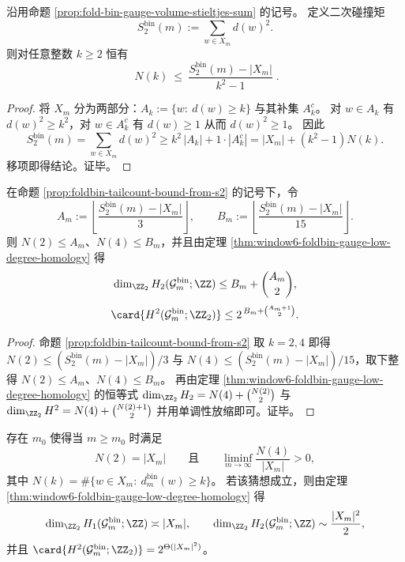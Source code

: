 \begin{proposition}[二次碰撞矩对阈值尾计数的普适上界]\label{prop:foldbin-tailcount-bound-from-s2}
沿用命题 \ref{prop:fold-bin-gauge-volume-stieltjes-sum} 的记号。
定义二次碰撞矩
\[
S_2^{\mathrm{bin}}(m):=\sum_{w\in X_m}d(w)^2.
\]
则对任意整数 \(k\ge 2\) 恒有
\[
\boxed{\;
N(k)\ \le\ \frac{S_2^{\mathrm{bin}}(m)-|X_m|}{k^2-1}\; }.
\]
\end{proposition}
\begin{proof}
将 \(X_m\) 分为两部分：\(A_k:=\{w:\ d(w)\ge k\}\) 与其补集 \(A_k^{c}\)。
对 \(w\in A_k\) 有 \(d(w)^2\ge k^2\)，对 \(w\in A_k^{c}\) 有 \(d(w)\ge 1\) 从而 \(d(w)^2\ge 1\)。
因此
\[
S_2^{\mathrm{bin}}(m)=\sum_{w\in X_m}d(w)^2
\ge
k^2\,|A_k|+1\cdot|A_k^{c}|
=|X_m|+(k^2-1)N(k).
\]
移项即得结论。证毕。
\end{proof}

\begin{corollary}\label{cor:foldbin-central-2extension-moment-certificate}
在命题 \ref{prop:foldbin-tailcount-bound-from-s2} 的记号下，令
\[
A_m:=\left\lfloor\frac{S_2^{\mathrm{bin}}(m)-|X_m|}{3}\right\rfloor,
\qquad
B_m:=\left\lfloor\frac{S_2^{\mathrm{bin}}(m)-|X_m|}{15}\right\rfloor.
\]
则 \(N(2)\le A_m\)、\(N(4)\le B_m\)，并且由定理 \ref{thm:window6-foldbin-gauge-low-degree-homology} 得
\[
\dim_{\ZZ_2}H_2(\mathcal{G}^{\mathrm{bin}}_m;\ZZ)
\le
B_m+\binom{A_m}{2},
\]
\[
\card{H^2(\mathcal{G}^{\mathrm{bin}}_m;\ZZ_2)}
\le
2^{\,B_m+\binom{A_m+1}{2}}.
\]
\end{corollary}
\begin{proof}
命题 \ref{prop:foldbin-tailcount-bound-from-s2} 取 \(k=2,4\) 即得 \(N(2)\le (S_2^{\mathrm{bin}}(m)-|X_m|)/3\) 与 \(N(4)\le (S_2^{\mathrm{bin}}(m)-|X_m|)/15\)，取下整得 \(N(2)\le A_m\)、\(N(4)\le B_m\)。
再由定理 \ref{thm:window6-foldbin-gauge-low-degree-homology} 的恒等式
\(
\dim_{\ZZ_2}H_2=N(4)+\binom{N(2)}{2}
\)
与
\(
\dim_{\ZZ_2}H^2=N(4)+\binom{N(2)+1}{2}
\)
并用单调性放缩即可。证毕。
\end{proof}

\begin{conjecture}[二值同调饱和与二次级中心扩张爆炸]\label{conj:foldbin-gauge-homology-saturation}
存在 \(m_0\) 使得当 \(m\ge m_0\) 时满足
\[
N(2)=|X_m|
\qquad\text{且}\qquad
\liminf_{m\to\infty}\frac{N(4)}{|X_m|}>0,
\]
其中 \(N(k)=\#\{w\in X_m:\ d^{\mathrm{bin}}_m(w)\ge k\}\)。
若该猜想成立，则由定理 \ref{thm:window6-foldbin-gauge-low-degree-homology} 得
\[
\dim_{\ZZ_2}H_1(\mathcal{G}^{\mathrm{bin}}_m;\ZZ)\asymp |X_m|,
\qquad
\dim_{\ZZ_2}H_2(\mathcal{G}^{\mathrm{bin}}_m;\ZZ)\sim \frac{|X_m|^2}{2},
\]
并且
\(
\card{H^2(\mathcal{G}^{\mathrm{bin}}_m;\ZZ_2)}=2^{\Theta(|X_m|^2)}
\)。
\end{conjecture}

